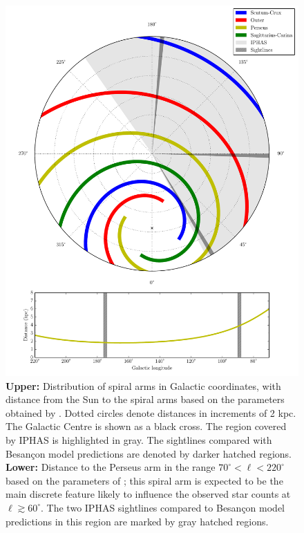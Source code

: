 \documentclass[a4paper,useAMS,usenatbib]{mn2e}
\begin{document}
\begin{figure}
\begin{center}
\includegraphics[width=1.0\linewidth]{figures/spiral_arms.pdf}
\caption{\footnotesize \textbf{Upper:} Distribution of spiral arms in Galactic coordinates, with distance from the Sun to the spiral arms based on the parameters obtained by \citet{Vallee2008}. Dotted circles denote distances in increments of 2 kpc. The Galactic Centre is shown as a black cross. The region covered by IPHAS is highlighted in gray. The sightlines compared with Besan\c{c}on model predictions are denoted by darker hatched regions. \textbf{Lower:} Distance to the Perseus arm in the range $70^{\circ}<\ell<220^{\circ}$ based on the parameters of \citet{Vallee2008}; this spiral arm is expected to be the main discrete feature likely to influence the observed star counts at $\ell\gtrsim 60^{\circ}$. The two IPHAS sightlines compared to Besan\c{c}on model predictions in this region are marked by gray hatched regions.}
\label{fig:spiral_arms}
\end{center}
\end{figure}
\end{document}
